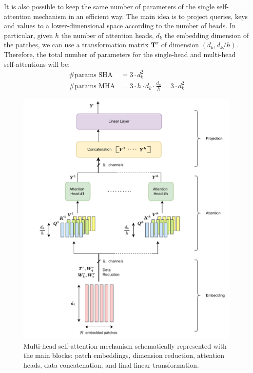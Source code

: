 It is also possible to keep the same number of parameters of the single 
self-attention mechanism in an efficient way. The main idea is to project queries, 
keys and values to a lower-dimensional space according to the number of heads.
In particular, given $h$ the number of attention heads, $d_k$ the embedding 
dimension of the patches, we can use a transformation matrix 
$\boldsymbol{T^r}$ of dimension $\left(d_k, d_k/h\right)$.
Therefore, the total number of parameters for
the single-head and multi-head self-attentions will be:
\begin{align*}
    \text{\#params SHA} &= 3 \cdot d_k^2 \\
    \text{\#params MHA} &= 3 \cdot h \cdot d_k \cdot\frac{d_k}{h} = 3 \cdot d_k^2
\end{align*}
\begin{figure}[htbp]
    \centering
    \includegraphics[width=\textwidth]{images/vit/multi_head_attention_scheme.png}
    \caption[Multi-head self-attention mechanism.]
    {Multi-head self-attention mechanism schematically represented with 
    the main blocks: patch embeddings, dimension reduction, attention heads, 
    data concatenation, and final linear transformation.}
    \label{fig:multi_head_attention}
\end{figure}
